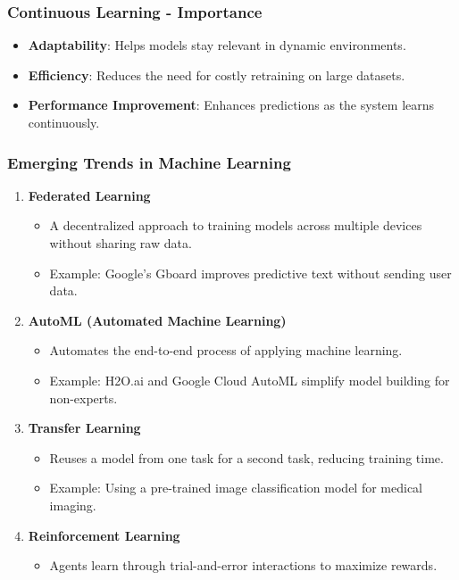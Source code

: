 \documentclass{beamer}
\begin{document}
\begin{frame}[fragile]
    \frametitle{Continuous Learning - Importance}
    \begin{itemize}
        \item \textbf{Adaptability}: Helps models stay relevant in dynamic environments.
        \item \textbf{Efficiency}: Reduces the need for costly retraining on large datasets.
        \item \textbf{Performance Improvement}: Enhances predictions as the system learns continuously.
    \end{itemize}
\end{frame}

\begin{frame}[fragile]
    \frametitle{Emerging Trends in Machine Learning}
    \begin{enumerate}
        \item \textbf{Federated Learning}
            \begin{itemize}
                \item A decentralized approach to training models across multiple devices without sharing raw data.
                \item Example: Google's Gboard improves predictive text without sending user data.
            \end{itemize}
        \item \textbf{AutoML (Automated Machine Learning)}
            \begin{itemize}
                \item Automates the end-to-end process of applying machine learning.
                \item Example: H2O.ai and Google Cloud AutoML simplify model building for non-experts.
            \end{itemize}
        \item \textbf{Transfer Learning}
            \begin{itemize}
                \item Reuses a model from one task for a second task, reducing training time.
                \item Example: Using a pre-trained image classification model for medical imaging.
            \end{itemize}
        \item \textbf{Reinforcement Learning}
            \begin{itemize}
                \item Agents learn through trial-and-error interactions to maximize rewards.

\end{itemize}
\end{enumerate}
\end{frame}
\end{document}
